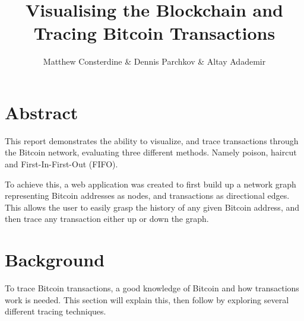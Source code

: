 \documentclass{article}
\title{Visualising the Blockchain and Tracing Bitcoin Transactions}
\author{Matthew Consterdine \& Dennis Parchkov \& Altay Adademir}
\date{}
\begin{document}
\vspace*{-5em}

\begin{figure}[H]
  \centering
  \label{fig:distancecolouringtitle}
\end{figure}
\vspace*{-3em}

\section*{Abstract}

This report demonstrates the ability to visualize, and trace transactions through the Bitcoin network, evaluating three different methods. Namely poison, haircut and First-In-First-Out (FIFO). 

To achieve this, a web application was created to first build up a network graph representing Bitcoin addresses as nodes, and transactions as directional edges. This allows the user to easily grasp the history of any given Bitcoin address, and then trace any transaction either up or down the graph.

\section{Background}

To trace Bitcoin transactions, a good knowledge of Bitcoin and how transactions work is needed. This section will explain this, then follow by exploring several different tracing techniques.
\end{document}
